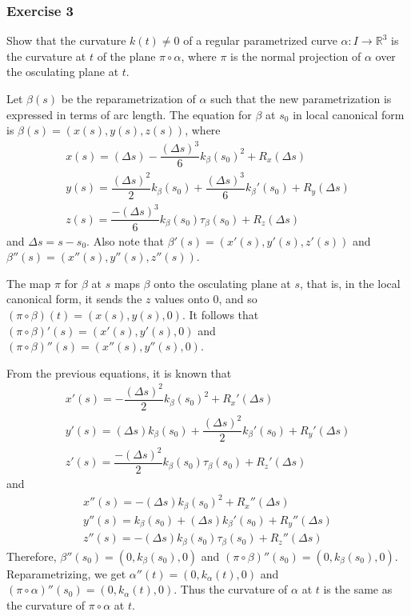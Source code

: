\documentclass{article}
\newcommand{\R}{\mathbb{R}}
\begin{document}
	\subsubsection*{Exercise 3}
	Show that the curvature $k(t) \neq 0$ of a regular parametrized curve $\alpha: I \to \R^3$ is the curvature at $t$ of the plane $\pi \circ \alpha$, where $\pi$ is the normal projection of $\alpha$ over the osculating plane at $t$.
	
	Let $\beta(s)$ be the reparametrization of $\alpha$ such that the new parametrization is expressed in terms of arc length. The equation for $\beta$ at $s_0$ in local canonical form is $\beta(s) = \left( x(s), y(s), z(s) \right)$, where
	\begin{gather*}
		x(s) = (\Delta s) - \dfrac{(\Delta s)^3}{6} k_{\beta}(s_0)^2 + R_x(\Delta s) \\
		y(s) = \dfrac{(\Delta s)^2}{2} k_{\beta}(s_0) + \dfrac{(\Delta s)^3}{6} k_{\beta}'(s_0) + R_y(\Delta s) \\
		z(s) = \dfrac{-(\Delta s)^3}{6} k_{\beta}(s_0) \tau_{\beta}(s_0) + R_z(\Delta s)
	\end{gather*}
	and $\Delta s = s - s_0$. Also note that $\beta'(s) = \left( x'(s), y'(s), z'(s) \right)$ and $\beta''(s) = \left( x''(s), y''(s), z''(s) \right)$.
	
	The map $\pi$ for $\beta$ at $s$ maps $\beta$ onto the osculating plane at $s$, that is, in the local canonical form, it sends the $z$ values onto 0, and so $( \pi \circ \beta )(t) = \left( x(s), y(s), 0 \right)$. It follows that $( \pi \circ \beta )'(s) = \left( x'(s), y'(s), 0 \right)$ and $( \pi \circ \beta )''(s) = \left( x''(s), y''(s), 0 \right)$.
	
	From the previous equations, it is known that
	\begin{gather*}
		x'(s) = - \dfrac{(\Delta s)^2}{2} k_{\beta}(s_0)^2 + R_x'(\Delta s) \\
		y'(s) = (\Delta s) k_{\beta}(s_0) + \dfrac{(\Delta s)^2}{2} k_{\beta}'(s_0) + R_y'(\Delta s) \\
		z'(s) = \dfrac{-(\Delta s)^2}{2} k_{\beta}(s_0) \tau_{\beta}(s_0) + R_z'(\Delta s)
	\end{gather*}
	and
	\begin{gather*}
		x''(s) = - (\Delta s) k_{\beta}(s_0)^2 + R_x''(\Delta s) \\
		y''(s) = k_{\beta}(s_0) + (\Delta s) k_{\beta}'(s_0) + R_y''(\Delta s) \\
		z''(s) = -(\Delta s) k_{\beta}(s_0) \tau_{\beta}(s_0) + R_z''(\Delta s)
	\end{gather*}
	Therefore, $\beta''(s_0) = (0, k_{\beta}(s_0), 0)$ and $( \pi \circ \beta )''(s_0) = \left( 0, k_{\beta}(s_0), 0 \right)$. Reparametrizing, we get $\alpha''(t) = (0, k_{\alpha}(t), 0)$ and $( \pi \circ \alpha )''(s_0) = \left( 0, k_{\alpha}(t), 0 \right)$. Thus the curvature of $\alpha$ at $t$ is the same as the curvature of $\pi \circ \alpha$ at $t$.
	
\end{document}
